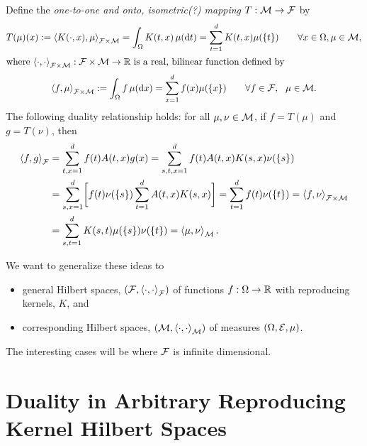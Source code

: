 \documentclass[reqno]{amsart}
\begin{document}
Define the \emph{one-to-one and onto, isometric(?) mapping} $T : \cm \to \cf$ by 
\begin{gather*}
    T(\mu)(x) := \ip[\cf \times \cm]{K(\cdot, x)}{\mu} = \int_\Omega K(t, x) \, \mu(\dif t) = \sum_{t=1}^d K(t,x) \mu(\{t\}) \qquad \forall x \in \Omega, \mu \in \cm, \\
    \intertext{where $ \ip[\cf \times \cm]{\cdot}{\cdot} : \cf \times \cm \to \reals$ is a real, bilinear function defined by} 
    \ip[\cf \times \cm]{f}{\mu} := \int_\Omega f \, \mu(\dif x) = \sum_{x=1}^d f(x) \mu(\{x\}) \qquad \forall f \in \cf, \ \  \mu \in \cm.
\end{gather*}
The following duality relationship holds:  for all $\mu, \nu \in \cm$, if $f = T(\mu)$ and $g = T (\nu)$, then 
\begin{align*}
    \ip[\cf]{f}{g} 
    & = \sum_{t,x=1}^d f(t) A(t,x) g(x)
    = \sum_{s,t,x=1}^d f(t) A(t,x)  K(s,x) \nu(\{s\})  \\
    &
    = \sum_{s,x=1}^d \biggl [ f(t) \nu(\{s\}) \sum_{t=1}^d A(t,x)  K(s,x) \biggr]
    = \sum_{t=1}^d f(t) \nu(\{t\}) = \ip[\cf \times \cm]{f}{\nu} \\
    & = \sum_{s,t=1}^d K(s,t) \mu(\{s\}) \nu(\{t\}) =  \ip[\cm]{\mu}{\nu} .
\end{align*}

We want to generalize these ideas to 
\begin{itemize}
    \item general Hilbert spaces, $(\cf, \ip[\cf]{\cdot}{\cdot})$  of functions $f : \Omega \to \reals$ with reproducing kernels, $K$, and 
    \item corresponding Hilbert spaces, $(\cm, \ip[\cm]{\cdot}{\cdot})$  of measures $(\Omega, \ce, \mu)$.
\end{itemize}
The interesting cases will be where $\cf$ is infinite dimensional.



\section{Duality in Arbitrary Reproducing Kernel Hilbert Spaces}
\end{document}
